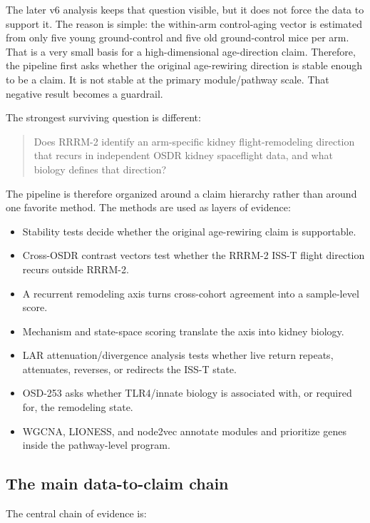 \documentclass[11pt]{article}
\begin{document}
The later v6 analysis keeps that question visible, but it does not force the data to support it. The reason is simple: the within-arm control-aging vector is estimated from only five young ground-control and five old ground-control mice per arm. That is a very small basis for a high-dimensional age-direction claim. Therefore, the pipeline first asks whether the original age-rewiring direction is stable enough to be a claim. It is not stable at the primary module/pathway scale. That negative result becomes a guardrail.

The strongest surviving question is different:

\begin{quote}
Does RRRM-2 identify an arm-specific kidney flight-remodeling direction that recurs in independent OSDR kidney spaceflight data, and what biology defines that direction?
\end{quote}

The pipeline is therefore organized around a claim hierarchy rather than around one favorite method. The methods are used as layers of evidence:

\begin{itemize}
  \item Stability tests decide whether the original age-rewiring claim is supportable.
  \item Cross-OSDR contrast vectors test whether the RRRM-2 ISS-T flight direction recurs outside RRRM-2.
  \item A recurrent remodeling axis turns cross-cohort agreement into a sample-level score.
  \item Mechanism and state-space scoring translate the axis into kidney biology.
  \item LAR attenuation/divergence analysis tests whether live return repeats, attenuates, reverses, or redirects the ISS-T state.
  \item OSD-253 asks whether TLR4/innate biology is associated with, or required for, the remodeling state.
  \item WGCNA, LIONESS, and node2vec annotate modules and prioritize genes inside the pathway-level program.
\end{itemize}

\subsection{The main data-to-claim chain}

The central chain of evidence is:
\end{document}

